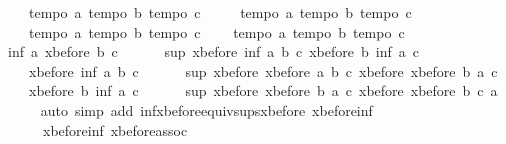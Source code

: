 \begin{isabellebody}
\ \ \ \ {\isachardoublequoteopen}tempo{}\ a{\isachardoublequoteclose}\ {\isachardoublequoteopen}tempo{}\ b{\isachardoublequoteclose}\ {\isachardoublequoteopen}tempo{}\ c{\isachardoublequoteclose}\ \isanewline
\ \ \ \ {\isachardoublequoteopen}tempo{}\ a{\isachardoublequoteclose}\ {\isachardoublequoteopen}tempo{}\ b{\isachardoublequoteclose}\ {\isachardoublequoteopen}tempo{}\ c{\isachardoublequoteclose}\ \isanewline
\ \ \ \ {\isachardoublequoteopen}tempo{}\ a{\isachardoublequoteclose}\ {\isachardoublequoteopen}tempo{}\ b{\isachardoublequoteclose}\ {\isachardoublequoteopen}tempo{}\ c{\isachardoublequoteclose}\isanewline
\ \ \ \ {\isachardoublequoteopen}tempo{}\ a{\isachardoublequoteclose}\ {\isachardoublequoteopen}tempo{}\ b{\isachardoublequoteclose}\ {\isachardoublequoteopen}tempo{}\ c{\isachardoublequoteclose}\isanewline
\ \ \isamarkupfalse%
\ {\isachardoublequoteopen}inf\ a\ {\isacharparenleft}xbefore\ b\ c{\isacharparenright}\ {\isacharequal}\ \isanewline
\ \ \ \ sup\ {\isacharparenleft}xbefore\ {\isacharparenleft}inf\ a\ b{\isacharparenright}\ c{\isacharparenright}\ {\isacharparenleft}xbefore\ b\ {\isacharparenleft}inf\ a\ c{\isacharparenright}{\isacharparenright}{\isachardoublequoteclose}\isanewline
\ \ \ \ {\isachardoublequoteopen}xbefore\ {\isacharparenleft}inf\ a\ b{\isacharparenright}\ c\ {\isacharequal}\ \isanewline
\ \ \ \ sup\ {\isacharparenleft}xbefore\ {\isacharparenleft}xbefore\ a\ b{\isacharparenright}\ c{\isacharparenright}\ {\isacharparenleft}xbefore\ {\isacharparenleft}xbefore\ b\ a{\isacharparenright}\ c{\isacharparenright}{\isachardoublequoteclose}\isanewline
\ \ \ \ {\isachardoublequoteopen}xbefore\ b\ {\isacharparenleft}inf\ a\ c{\isacharparenright}\ {\isacharequal}\ \isanewline
\ \ \ \ sup\ {\isacharparenleft}xbefore\ {\isacharparenleft}xbefore\ b\ a{\isacharparenright}\ c{\isacharparenright}\ {\isacharparenleft}xbefore\ {\isacharparenleft}xbefore\ b\ c{\isacharparenright}\ a{\isacharparenright}{\isachardoublequoteclose}\isanewline
\ \ \ \ \isamarkupfalse%
\ {\isacharparenleft}auto\ simp\ add{\isacharcolon}\ inf{\isacharunderscore}xbefore{\isacharunderscore}equiv{\isacharunderscore}sups{\isacharunderscore}xbefore\ xbefore{\isacharunderscore}inf{\isacharunderscore}{}\ \isanewline
\ \ \ \ \ \ xbefore{\isacharunderscore}inf{\isacharunderscore}{}\ xbefore{\isacharunderscore}assoc{\isacharparenright}\isanewline
\ \ \isamarkupfalse%

\end{isabellebody}
